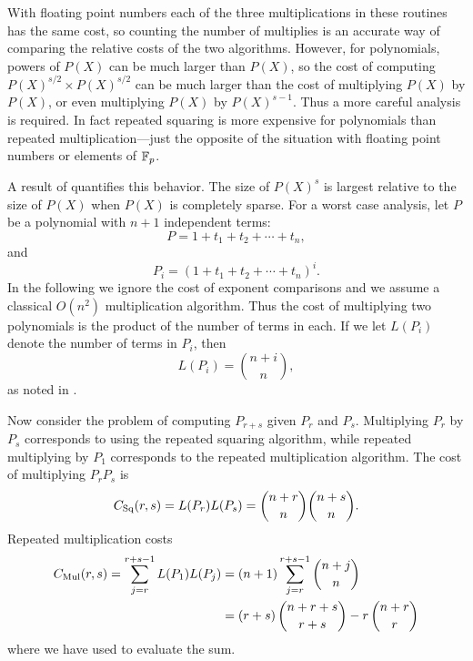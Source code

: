 \noindent
With floating point numbers each of the three multiplications in these
routines has the same cost, so counting the number of multiplies is an
accurate way of comparing the relative costs of the two algorithms.
However, for polynomials, powers of $P(X)$ can be much larger than
$P(X)$, so the cost of computing $P(X)^{s/2} \times P(X)^{s/2}$ can be
much larger than the cost of multiplying $P(X)$ by $P(X)$, or even
multiplying $P(X)$ by $P(X)^{s-1}$.  Thus a more careful analysis is
required.  In fact repeated squaring is more expensive for polynomials
than repeated multiplication---just the opposite of the situation with
floating point numbers or elements of $\mathbb{F}_p$.

A result of {\Gentleman} \cite{Gentleman:Exp} quantifies this
behavior.  The size of $P(X)^s$ is largest relative to the size of
$P(X)$ when $P(X)$ is completely sparse.  For a worst case analysis,
let $P$ be a polynomial with $n+1$ independent terms:
\[
P = 1 + t_1 + t_2 + \cdots + t_n,
\]
and
\[
P_i = (1 + t_1 + t_2 + \cdots + t_n)^i.
\]
In the following we ignore the cost of exponent comparisons and we assume a
classical $O(n^{2})$ multiplication algorithm.  Thus the cost of
multiplying two polynomials is the product of the number of terms in each.
If we let $L(P_i)$ denote the number of terms in $P_i$, then
\[
L(P_i) = \binom{n + i}{n},
\]
as noted in .

\newcommand{\Csq}{C_{\rm Sq}}
\newcommand{\Cmul}{C_{\rm Mul}}
Now consider the problem of computing $P_{r+s}$ given $P_r$ and $P_s$.
Multiplying $P_r$ by $P_s$ corresponds to using the repeated squaring
algorithm, while repeated multiplying by $P_1$ corresponds to the repeated
multiplication algorithm.  The cost of multiplying $P_r P_s$ is
\[
\Csq(r, s) = L(P_r) L(P_s) = \binom{n + r}{n} \binom{n + s}{n}.
\]
Repeated multiplication costs
\[
\begin{aligned}
  \Cmul(r, s) = 
  \sum_{j=r}^{r+s-1} L(P_1) L(P_j) &=
    (n+1) \sum_{j=r}^{r+s-1} \binom{n + j}{n}\\
     &= (r + s)\, \binom{n + r + s}{r+s} - r\, \binom{n + r}{r}
\end{aligned}
\]
where we have used  to evaluate the sum.


